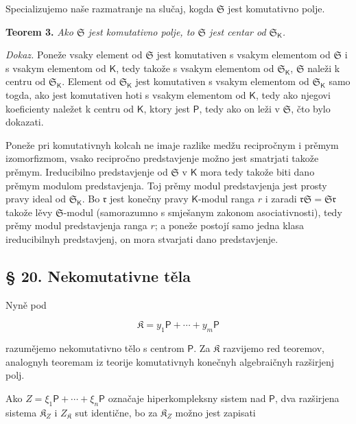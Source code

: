 \documentclass[11pt]{article}
\begin{document}
Specializujemo naše razmatranje na slučaj, kogda \(\mathfrak S\) jest komutativno polje.

\textbf{Teorem 3.} \emph{Ako \(\mathfrak S\) jest komutativno polje, to \(\mathfrak S\) jest centar od \(\mathfrak S_{\mathsf K}\).}

\emph{Dokaz.} Poneže vsaky element od \(\mathfrak S\) jest komutativen s vsakym elementom od \(\mathfrak S\) i s vsakym elementom od \(\mathsf K\), tedy takože s vsakym elementom od \(\mathfrak S_{\mathsf K}\), \(\mathfrak S\) naleži k centru od \(\mathfrak S_{\mathsf K}\). Element od \(\mathfrak S_{\mathsf K}\) jest komutativen s vsakym elementom od \(\mathfrak S_{\mathsf K}\) samo togda, ako jest komutativen hoti s vsakym elementom od \(\mathsf K\), tedy ako njegovi koeficienty naležet k centru od \(\mathsf K\), ktory jest \(\mathsf P\), tedy ako on leži v \(\mathfrak S\), čto bylo dokazati.

Poneže pri komutativnyh kolcah ne imaje razlike medžu recipročnym i prěmym izomorfizmom, vsako recipročno predstavjenje možno jest smatrjati takože prěmym. Ireducibilno predstavjenje od \(\mathfrak S\) v \(\mathsf K\) mora tedy takože biti dano prěmym modulom predstavjenja. Toj prěmy modul predstavjenja jest prosty pravy ideal od \(\mathfrak S_{\mathsf K}\). Bo \(\mathfrak r\) jest konečny pravy \(\mathsf K\)-modul ranga \(r\) i zaradi \(\mathfrak r\mathfrak S=\mathfrak S\mathfrak r\) takože lěvy \(\mathfrak S\)-modul (samorazumno s smješanym zakonom asociativnosti), tedy prěmy modul predstavjenja ranga \(r\); a poneže postojí samo jedna klasa ireducibilnyh predstavjenj, on mora stvarjati dano predstavjenje.

\subsection*{§ 20. Nekomutativne těla}\label{nichtkommutative-koerper}

Nyně pod

\[
\mathfrak K=y_1\mathsf P+\cdots+y_m\mathsf P
\]

razumějemo nekomutativno tělo s centrom \(\mathsf P\). Za \(\mathfrak K\) razvijemo red teoremov, analognyh teoremam iz teorije komutativnyh konečnyh algebraičnyh razširjenj polj.

Ako \(Z=\xi_1\mathsf P+\cdots+\xi_n\mathsf P\) označaje hiperkompleksny sistem nad \(\mathsf P\), dva razširjena sistema \(\mathfrak K_Z\) i \(Z_{\mathfrak K}\) sut identične, bo za \(\mathfrak K_Z\) možno jest zapisati
\end{document}
